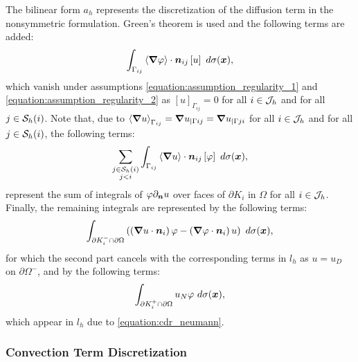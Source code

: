 The bilinear form $a_h$ represents the discretization of the diffusion term in the nonsymmetric formulation. Green's theorem is used and the following terms are added:
\begin{gather}
    \int_{\Gamma_{ij}} \left\langle \bm{\nabla} \varphi \right\rangle \cdot \bm{n}_{ij} \left[ u \right] ~ d \sigma(\bm{x}),
\end{gather}
which vanish under assumptions \eqref{equation:assumption_regularity_1} and \eqref{equation:assumption_regularity_2} as $\left[ u \right]_{\Gamma_{ij}} = 0$ for all $i \in \mathcal{J}_h$ and for all $j \in \mathcal{S}_h(i)$. Note that, due to $\left\langle \bm{\nabla} u \right\rangle_{\Gamma_{ij}} = \bm{\nabla} u_{\mid \Gamma{ij}} = \bm{\nabla} u_{\mid \Gamma{ji}}$ for all $i \in \mathcal{J}_h$ and for all $j \in \mathcal{S}_h(i)$, the following terms:
\begin{gather}
    \sum_{\substack{j \in \mathcal{S}_h(i) \\ j < i}} \int_{\Gamma_{ij}} \left\langle \bm{\nabla} u \right\rangle \cdot \bm{n}_{ij} \left[ \varphi \right] ~ d \sigma(\bm{x}),
\end{gather}
represent the sum of integrals of $\varphi \partial_{\bm{n}} u$ over faces of $\partial K_i$ in $\Omega$ for all $i \in \mathcal{J}_h$. Finally, the remaining integrals are represented by the following terms:
\begin{gather}
    \int_{\partial K_i^- \cap \partial \Omega} \left( \left( \bm{\nabla} u \cdot \bm{n}_i \right) \varphi - \left( \bm{\nabla} \varphi \cdot \bm{n}_i \right) u \right) ~ d \sigma(\bm{x}),
\end{gather}
for which the second part cancels with the corresponding terms in $l_h$ as $u = u_D$ on $\partial \Omega^-$, and by the following terms:
\begin{gather}
    \int_{\partial K_i^+ \cap \partial \Omega} u_N \varphi ~ d \sigma(\bm{x}),
\end{gather}
which appear in $l_h$ due to \eqref{equation:cdr_neumann}.

\newpage
\subsubsection{Convection Term Discretization}

